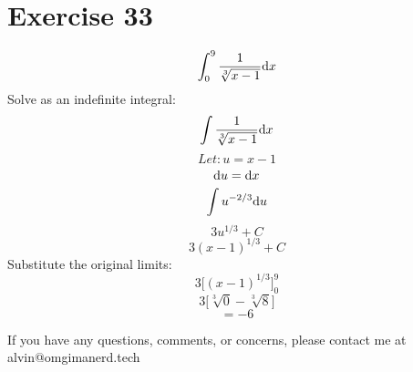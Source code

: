 \documentclass{math}
\begin{document}
\section*{Exercise 33}
\[ \int_{0}^{9}{\frac{1}{\sqrt[3]{x-1}}\mathrm{d}{x}} \]
Solve as an indefinite integral:
\[ \int{\frac{1}{\sqrt[3]{x-1}}\mathrm{d}{x}} \]
\[ Let: u = x-1 \]
\[ \mathrm{d}{u} = \mathrm{d}{x} \]
\[ \int{u^{-2/3}\mathrm{d}{u}} \]
\[ 3u^{1/3}+C \]
\[ 3(x-1)^{1/3}+C \]
Substitute the original limits:
\[ 3\bigg[(x-1)^{1/3}\bigg]_{0}^{9} \]
\[ 3\bigg[\sqrt[3]{0}-\sqrt[3]{8}] \]
\[ = -6 \]

\begin{center}
  If you have any questions, comments, or concerns, please contact me at
  alvin@omgimanerd.tech
\end{center}
\end{document}
